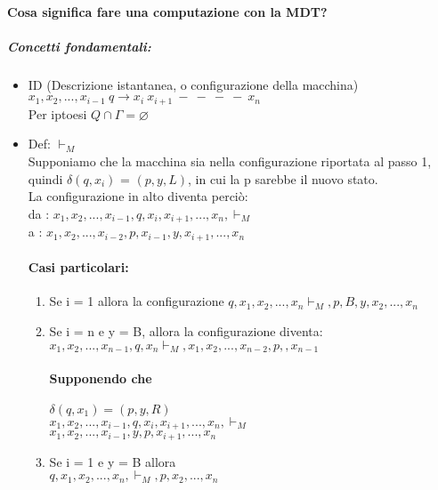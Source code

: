 \documentclass[12pt, a4paper, openany, oneside]{book}
\begin{document}
\paragraph{Cosa significa fare una computazione con la MDT?} 
\subparagraph{Concetti fondamentali:}
\begin{itemize}
		\item ID (Descrizione istantanea, o configurazione della macchina)\\
		$x_{1}, x_{2}, ..., x_{i-1} ~ q \to x_{i} ~ x_{i+1} ~ - ~ - ~ - ~ - ~x_{n}$\\
		Per iptoesi $Q \cap \Gamma = \varnothing$
		\item Def: $\vdash_{M}$ \\
		Supponiamo che la macchina sia nella configurazione riportata al passo 1,
		quindi $\delta(q, x_{i})$ = $(p, y, L)$, in cui la p sarebbe il nuovo 
		stato. \\
		La configurazione in alto diventa perciò: \\
		da : $x_{1}, x_{2}, ..., x_{i-1}, q, x_{i}, x_{i+1}, ..., x_{n}, \vdash_{M}$\\
		a : $x_{1}, x_{2}, ..., x_{i - 2}, p, x_{i-1}, y, x_{i+1}, ..., x_{n}$
		\paragraph{Casi particolari:}
		\begin{enumerate}
			\item Se i = 1 allora la configurazione $q, x_{1}, x_{2}, ..., x_{n}
			 \vdash_{M}, p, B, y, x_{2}, ..., x_{n}$
			 \item Se i = n e  y = B, allora la configurazione diventa:
			 $x_{1}, x_{2}, ..., x_{n-1}, q, x_{n} \vdash_{M}, x_{1}, x_{2}, 
			 ..., x_{n-2},  p,  , x_{n-1}$\\
			 \paragraph{Supponendo che } $\delta(q, x_{1}) = (p, y, R)$\\
			 $x_{1}, x_{2}, ..., x_{i-1}, q, x_{i}, x_{i+1}, ..., x_{n}, \vdash_{M}$\\
			 $x_{1}, x_{2}, ..., x_{i-1}, y, p, x_{i+1}, ..., x_{n}$
			 \item Se i = 1 e y = B allora\\
			 $q, x_{1}, x_{2}, ..., x_{n}, \vdash_{M}, p, x_{2}, ..., x_{n}$
		\end{enumerate}
\end{itemize}	
\end{document}
